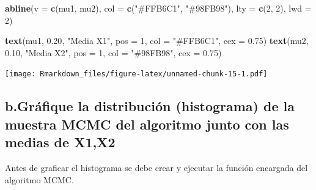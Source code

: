 \documentclass[
]{article}
\newenvironment{Shaded}{\begin{snugshade}}{\end{snugshade}}
\newcommand{\AttributeTok}[1]{\textcolor[rgb]{0.13,0.29,0.53}{#1}}
\newcommand{\DecValTok}[1]{\textcolor[rgb]{0.00,0.00,0.81}{#1}}
\newcommand{\FloatTok}[1]{\textcolor[rgb]{0.00,0.00,0.81}{#1}}
\newcommand{\FunctionTok}[1]{\textcolor[rgb]{0.13,0.29,0.53}{\textbf{#1}}}
\newcommand{\NormalTok}[1]{#1}
\newcommand{\StringTok}[1]{\textcolor[rgb]{0.31,0.60,0.02}{#1}}
\begin{document}
\begin{Shaded}
\begin{Highlighting}[]
\FunctionTok{abline}\NormalTok{(}\AttributeTok{v =} \FunctionTok{c}\NormalTok{(mu1, mu2), }\AttributeTok{col =} \FunctionTok{c}\NormalTok{(}\StringTok{"\#FFB6C1"}\NormalTok{, }\StringTok{"\#98FB98"}\NormalTok{), }\AttributeTok{lty =} \FunctionTok{c}\NormalTok{(}\DecValTok{2}\NormalTok{, }\DecValTok{2}\NormalTok{), }\AttributeTok{lwd =} \DecValTok{2}\NormalTok{)}

\FunctionTok{text}\NormalTok{(mu1, }\FloatTok{0.20}\NormalTok{, }\StringTok{"Media X1"}\NormalTok{, }\AttributeTok{pos =} \DecValTok{1}\NormalTok{, }\AttributeTok{col =} \StringTok{"\#FFB6C1"}\NormalTok{, }\AttributeTok{cex =} \FloatTok{0.75}\NormalTok{)}
\FunctionTok{text}\NormalTok{(mu2, }\FloatTok{0.10}\NormalTok{, }\StringTok{"Media X2"}\NormalTok{, }\AttributeTok{pos =} \DecValTok{1}\NormalTok{, }\AttributeTok{col =} \StringTok{"\#98FB98"}\NormalTok{, }\AttributeTok{cex =} \FloatTok{0.75}\NormalTok{)}
\end{Highlighting}
\end{Shaded}

\texttt{[image: Rmarkdown\_files/figure-latex/unnamed-chunk-15-1.pdf]}

\hypertarget{b.gruxe1fique-la-distribuciuxf3n-histograma-de-la-muestra-mcmc-del-algoritmo-junto-con-las-medias-de-x1x2}{%
\subsection{b.Gráfique la distribución (histograma) de la muestra MCMC
del algoritmo junto con las medias de
X1,X2}\label{b.gruxe1fique-la-distribuciuxf3n-histograma-de-la-muestra-mcmc-del-algoritmo-junto-con-las-medias-de-x1x2}}

Antes de graficar el histograma se debe crear y ejecutar la función
encargada del algoritmo MCMC.
\end{document}
